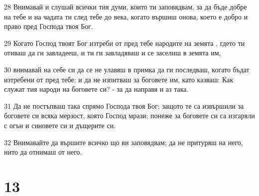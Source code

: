 \par 28 Внимавай и слушай всички тия думи, които ти заповядвам, за да бъде добре на тебе и на чадата ти след тебе до века, когато вършиш онова, което е добро и право пред Господа твоя Бог.
\par 29 Когато Господ твоят Бог изтреби от пред тебе народите на земята , гдето ти отиваш да ги завладееш, и ти ги завладяваш и се заселиш в земята им,
\par 30 внимавай на себе си да се не улавяш в примка да ги последваш, когато бъдат изтребени от пред тебе; и да не изпитваш за боговете им, като казваш: Как служат тия народи на боговете си? - за да направя и аз така.
\par 31 Да не постъпваш така спрямо Господа твоя Бог; защото те са извършили за боговете си всяка мерзост, която Господ мрази; понеже за боговете си са изгаряли с огън и синовете си и дъщерите си.
\par 32 Внимавайте да вършите всичко що ви заповядвам; да не притуряш на него, нито да отнимаш от него.

\chapter{13}

